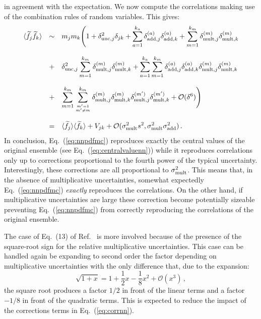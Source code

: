 \documentclass[10pt,a4paper]{article}
\begin{document}
in agreement with the expectation. We now compute the correlations
making use of the combination rules of random variables. This gives:
\begin{equation}\label{eq:corrnn}
\begin{array}{rcl}
  \langle \widetilde{f}_j \widetilde{f}_k\rangle&\sim&\displaystyle m_jm_k\Bigg(1+\delta_{{\rm unc},j}^2\delta_{jk}+\sum_{a=1}^{k_a} \delta_{{\rm add},j}^{(a)}\delta_{{\rm add},k}^{(a)} +\sum_{m=1}^{k_m}\delta_{{\rm mult},j}^{(m)}\delta_{{\rm mult},k}^{(m)}\\
\\
&+&\displaystyle\delta_{{\rm unc},j}^2 \sum_{m=1}^{k_m} \delta_{{\rm mult},j}^{(m)}\delta_{{\rm  mult},k}^{(m)}
  +\sum_{a=1}^{k_a} \sum_{m=1}^{k_m}\delta_{{\rm add},j}^{(a)}\delta_{{\rm add},k}^{(a)} \delta_{{\rm mult},j}^{(m)} \delta_{{\rm mult},k}^{(m)} \\
\\
&+&\displaystyle \sum_{m=1}^{k_m}\sum_{m'=1\atop m'\neq m}^{k_m}\delta_{{\rm
      mult},j}^{(m)}\delta_{{\rm
      mult},k}^{(m)}\delta_{{\rm mult},j}^{(m')}\delta_{{\rm
    mult},k}^{(m')}+\mathcal{O}(\delta^6)\Bigg)\\
\\
&=&\displaystyle \langle \widetilde{f}_j\rangle \langle
    \widetilde{f}_k\rangle +V_{jk}+\mathcal{O}(\sigma_{\rm mult}^2 s^2, \sigma_{\rm mult}^2 \sigma_{\rm add}^2)\,.
\end{array}
\end{equation}
In conclusion, Eq.~(\ref{eq:nnpdfmc}) reproduces exactly the central
values of the original ensemble (see Eq.~(\ref{eq:centralvaluenn}))
while it reproduces correlations only up to corrections proportional
to the fourth power of the typical uncertainty. Interestingly, these
corrections are all proportional to $\sigma_{\rm mult}^2$. This means
that, in the absence of multiplicative uncertainties, somewhat
expectedly Eq.~(\ref{eq:nnpdfmc}) \textit{exactly} reproduces the
correlations. On the other hand, if multiplicative uncertainties are
large these correction become potentially sizeable preventing
Eq.~(\ref{eq:nnpdfmc}) from correctly reproducing the correlations of
the original ensemble.

The case of Eq.~(13) of Ref.~\cite{Ball:2008by} is more involved
because of the presence of the square-root sign for the relative
multiplicative uncertainties. This case can be handled again be
expanding to second order the factor depending on multiplicative
uncertainties with the only difference that, due to the expansion:
\begin{equation}
  \sqrt{1+x}=1+\frac12x-\frac18x^2+\mathcal{O}(x^3)\,,
\end{equation}
the square root produces a factor $1/2$ in front of the linear terms
and a factor $-1/8$ in front of the quadratic terms. This is expected
to reduce the impact of the corrections terms in
Eq.~(\ref{eq:corrnn}).
\end{document}

